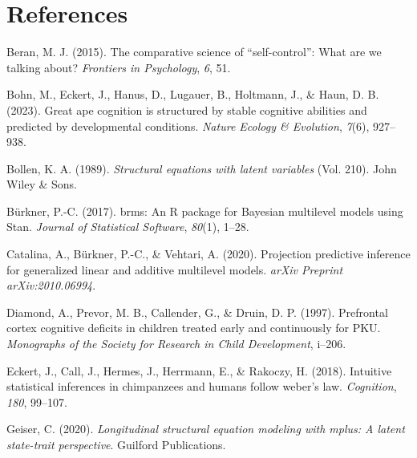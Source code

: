 \documentclass[
  man,floatsintext]{apa6}
\newlength{\cslhangindent}
\newlength{\cslentryspacingunit} %
\newenvironment{CSLReferences}[2] %
 {%
  \setlength{\parindent}{0pt}
  \ifodd #1
  \let\oldpar\par
  \def\par{\hangindent=\cslhangindent\oldpar}
  \fi
  \setlength{\parskip}{#2\cslentryspacingunit}
 }%
 {}
\begin{document}
\newpage

\hypertarget{references}{%
\section{References}\label{references}}

\hypertarget{refs}{}
\begin{CSLReferences}{1}{0}
\leavevmode{}%
Beran, M. J. (2015). The comparative science of {``self-control''}: What are we talking about? \emph{Frontiers in Psychology}, \emph{6}, 51.

\leavevmode{}%
Bohn, M., Eckert, J., Hanus, D., Lugauer, B., Holtmann, J., \& Haun, D. B. (2023). Great ape cognition is structured by stable cognitive abilities and predicted by developmental conditions. \emph{Nature Ecology \& Evolution}, \emph{7}(6), 927--938.

\leavevmode{}%
Bollen, K. A. (1989). \emph{Structural equations with latent variables} (Vol. 210). John Wiley \& Sons.

\leavevmode{}%
Bürkner, P.-C. (2017). {brms}: An {R} package for {Bayesian} multilevel models using {Stan}. \emph{Journal of Statistical Software}, \emph{80}(1), 1--28.

\leavevmode{}%
Catalina, A., Bürkner, P.-C., \& Vehtari, A. (2020). Projection predictive inference for generalized linear and additive multilevel models. \emph{arXiv Preprint arXiv:2010.06994}.

\leavevmode{}%
Diamond, A., Prevor, M. B., Callender, G., \& Druin, D. P. (1997). Prefrontal cortex cognitive deficits in children treated early and continuously for PKU. \emph{Monographs of the Society for Research in Child Development}, i--206.

\leavevmode{}%
Eckert, J., Call, J., Hermes, J., Herrmann, E., \& Rakoczy, H. (2018). Intuitive statistical inferences in chimpanzees and humans follow weber's law. \emph{Cognition}, \emph{180}, 99--107.

\leavevmode{}%
Geiser, C. (2020). \emph{Longitudinal structural equation modeling with mplus: A latent state-trait perspective}. Guilford Publications.


\end{CSLReferences}
\end{document}
